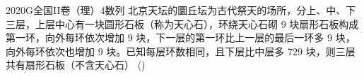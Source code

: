 
\begin{problem}{2020}{G}{全国II卷（理）}{4}{数列}
北京天坛的圜丘坛为古代祭天的场所，分上、中、下三层，上层中心有一块圆形石板（称为天心石），环绕天心石砌 $ 9 $ 块扇形石板构成第一环，向外每环依次增加 $ 9 $ 块，下一层的第一环比上一层的最后一环多 $ 9 $ 块，向外每环依次也增加 $ 9 $ 块。已知每层环数相同，且下层比中层多 $ 729 $ 块，则三层共有扇形石板（不含天心石） (\hspace{1cm})
\begin{choices}
\end{choices}
\end{problem}

\begin{answer}

\end{answer}

\begin{solutions}

\end{solutions}